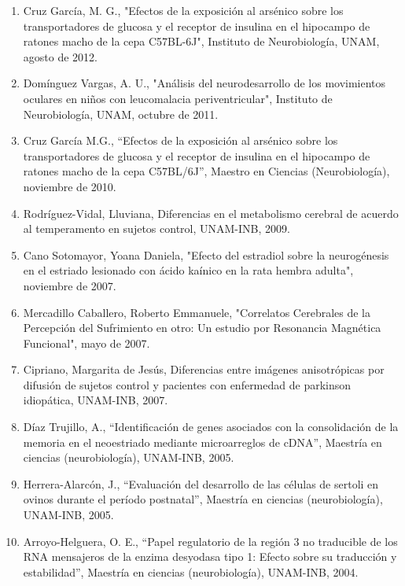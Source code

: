 \begin{enumerate}
\item Cruz García, M. G., "Efectos de la exposición al arsénico sobre los transportadores de glucosa y el receptor de insulina en el hipocampo de ratones 
macho de 
la cepa C57BL-6J", Instituto de Neurobiología, UNAM,   agosto de 2012.

\item Domínguez Vargas, A. U., "Análisis del neurodesarrollo de los movimientos oculares en niños con leucomalacia periventricular", Instituto de 
Neurobiología, 
UNAM,   octubre de 2011.

\item Cruz García M.G., “Efectos de la exposición al arsénico sobre los transportadores de glucosa y el receptor de insulina en el hipocampo de ratones 
macho de 
la cepa C57BL/6J”, Maestro en Ciencias (Neurobiología),   noviembre de 2010.

\item Rodríguez-Vidal, Lluviana, Diferencias en el metabolismo cerebral de acuerdo al temperamento en sujetos control, UNAM-INB,   2009.

\item Cano Sotomayor, Yoana Daniela, "Efecto del estradiol sobre la neurogénesis en el estriado lesionado con ácido kaínico en la rata hembra adulta",   
noviembre 
de 2007.

\item Mercadillo Caballero, Roberto Emmanuele, "Correlatos Cerebrales de la Percepción del Sufrimiento en otro: Un estudio por Resonancia Magnética 
Funcional",   
mayo de 2007.

\item Cipriano, Margarita de Jesús, Diferencias entre imágenes anisotrópicas por difusión de sujetos control y pacientes con enfermedad de parkinson 
idiopática, 
UNAM-INB,   2007.

\item Díaz Trujillo, A., “Identificación de genes asociados con la consolidación de la memoria en el neoestriado mediante microarreglos de cDNA”, Maestría 
en 
ciencias (neurobiología), UNAM-INB,   2005.

\item Herrera-Alarcón, J., “Evaluación del desarrollo de las células de sertoli en ovinos durante el período postnatal”, Maestría en ciencias 
(neurobiología), 
UNAM-INB,   2005.

\item Arroyo-Helguera, O. E., “Papel regulatorio de la región 3 no traducible de los RNA mensajeros de la enzima desyodasa tipo 1: Efecto sobre su 
traducción y 
estabilidad”, Maestría en ciencias (neurobiología), UNAM-INB,   2004.


\end{enumerate}
